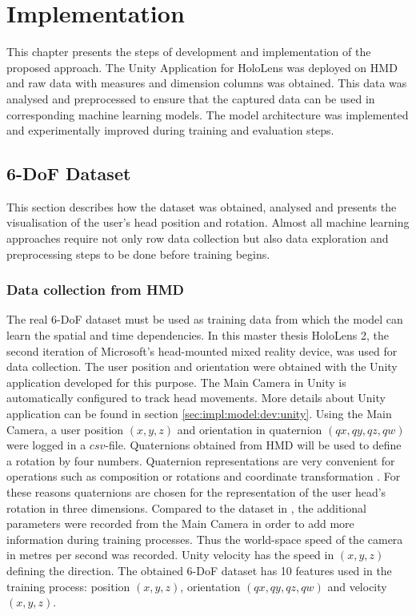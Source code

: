 \chapter{Implementation}
\label{sec:impl}
This chapter presents the steps of development and implementation of the proposed approach. The Unity Application for HoloLens was deployed on HMD and raw data with measures and dimension columns was obtained. This data was analysed and preprocessed to ensure that the captured data can be used in corresponding machine learning models. The model architecture was implemented and experimentally improved during training and evaluation steps.

\section{6-DoF Dataset}
\label{sec:impl:dataset}
This section describes how the dataset was obtained, analysed and presents the visualisation of the user's head position and rotation. Almost all machine learning approaches require not only row data collection but also data exploration and preprocessing steps to be done before training begins.

\subsection{Data collection from HMD}
\label{sec:impl:dataset:HL}
The real 6-DoF dataset must be used as training data from which the model can learn the spatial and time dependencies. In this master thesis HoloLens 2, the second iteration of Microsoft's head-mounted mixed reality device, was used for data collection. The user position and orientation were obtained with the Unity application developed for this purpose. The Main Camera in Unity is automatically configured to track head movements. More details about Unity application can be found in section \ref{sec:impl:model:dev:unity}. Using the Main Camera, a user position $(x, y, z)$ and orientation in quaternion $(qx, qy, qz, qw)$ were logged in a $csv$-file. Quaternions obtained from HMD will be used to define a rotation by four numbers. Quaternion representations are very convenient for operations such as composition or rotations and coordinate transformation \cite{principles_robot_motion_book}. For these reasons quaternions are chosen for the representation of the user head's rotation in three dimensions. Compared to the dataset in \cite{serhan_kalman}, the additional parameters were recorded from the Main Camera in order to add more information during training processes. Thus the world-space speed of the camera in metres per second was recorded. Unity velocity has the speed in $(x, y, z)$ defining the direction. The obtained 6-DoF dataset has 10 features used in the training process: position $(x, y, z)$, orientation $(qx, qy, qz, qw)$ and velocity $(x, y, z)$.

